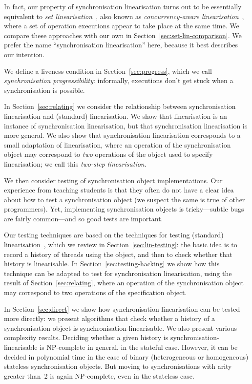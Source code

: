 In fact, our property of synchronisation linearisation turns out to be
essentially equivalent to \emph{set linearisation}~\cite{Neiger-1994}, also
known as \emph{concurrency-aware linearisation}~\cite{HRV-2015}, where a set
of operation executions appear to take place at the same time.  We compare
these approaches with our own in Section~\ref{sec:set-lin-comparison}.  We
prefer the name ``synchronisation linearisation'' here, because it best
describes our intention.

We define a liveness condition in Section~\ref{sec:progress}, which we call
\emph{synchronisation progressibility}: informally, executions don't get stuck
when a synchronisation is possible.

In Section~\ref{sec:relating} we consider the relationship between
synchronisation linearisation and (standard) linearisation.  We show that
linearisation is an instance of synchronisation linearisation, but that
synchronisation linearisation is more general.  We also show that
synchronisation linearisation corresponds to a small adaptation of
linearisation, where an operation of the synchronisation object may correspond
to \emph{two} operations of the object used to specify linearisation; we call
this \emph{two-step linearisation}.

We then consider testing of synchronisation object implementations.  Our
experience from teaching students is that they often do not have a clear idea
about how to test a synchronisation object (we suspect the same is true of
other programmers).  Yet, implementing synchronisation objects is
tricky---subtle bugs are fairly common---and so good tests are important.

Our testing techniques are based on the techniques for testing (standard)
linearisation~\cite{wing-gong,gavin:lin-testing}, which we review in
Section~\ref{sec:lin-testing}: the basic idea is to record a history of
threads using the object, and then to check whether that history is
linearisable.
%
In Section~\ref{sec:testing-hacking} we show how this technique can be adapted
to test for synchronisation linearisation, using the result of
Section~\ref{sec:relating}, where an operation of the synchronisation object
may correspond to two operations of the specification object.

In Section~\ref{sec:direct} we show how synchronisation linearisation can be
tested more directly: we present algorithms that check whether a history of a
synchronisation object is synchronisation-linearisable.  We also present
various complexity results.  Deciding whether a given history is
synchronisation-linearisable is NP-complete in general, in the stateful case.
However, it can be decided in polynomial time in the case of binary
(heterogeneous or homogeneous) stateless synchronisation objects.  But moving 
to synchronisations with arity greater than~2 is again NP-complete, even in
the stateless case. 


